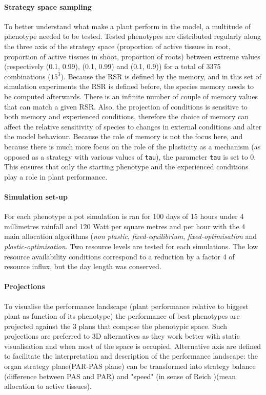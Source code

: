 \paragraph{Strategy space sampling}
To better understand what make a plant perform in the model, a multitude of phenotype needed to be tested. Tested phenotypes are distributed regularly along the three axis of the strategy space (proportion of active tissues in root, proportion of active tissues in shoot, proportion of roots) between extreme values (respectively (0.1, 0.99), (0.1, 0.99) and (0.1, 0.9)) for a total of 3375 combinations ($15^{3}$).  Because the RSR is defined by the memory, and in this set of simulation experiments the RSR is defined before, the species memory needs to be computed afterwards. There is an infinite number of couple of memory values that can match a given RSR. Also, the projection of conditions is sensitive to both memory and experienced conditions, therefore the choice of memory can affect the relative sensitivity of species to changes in external conditions and alter the model behaviour. Because the role of memory is not the focus here, and because there is much more focus on the role of the plasticity as a mechanism (as opposed as a strategy with various values of \texttt{tau}), the parameter \texttt{tau} is set to 0. This ensures that only the starting phenotype and the experienced conditions play a role in plant performance.

\paragraph{Simulation set-up}

For each phenotype a pot simulation is ran for 100 days of 15 hours under 4 millimetres rainfall and 120 Watt per square metres and per hour with the 4 main allocation algorithms (\textit{non plastic}, \textit{fixed-equilibrium}, \textit{fixed-optimisation} and \textit{plastic-optimisation}. Two resource levels are tested for each simulations. The low resource availability conditions correspond to a reduction by a factor 4 of resource influx, but the day length was conserved.

\paragraph{Projections}

To visualise the performance landscape (plant performance relative to biggest plant as function of its phenotype) the performance of best phenotypes are projected against the 3 plans that compose the phenotypic space. Such projections are preferred to 3D alternatives as they work better with static visualisation and when most of the space is occupied. Alternative axis are defined to facilitate the interpretation and description of the performance landscape: the organ strategy plane(PAR-PAS plane) can be transformed into strategy balance (difference between PAS and PAR) and "speed" (in sense of Reich \parencite{reich_world-wide_2014})(mean allocation to active tissues).

